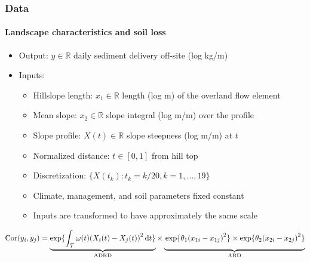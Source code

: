 \documentclass{snedecorbeamer}
\begin{document}
\begin{frame}
  \frametitle{Data}
  \framesubtitle{Landscape characteristics and soil loss}

  \begin{itemize}
  \item Output: $y\in\mathbb{R}$ daily sediment delivery off-site (log kg/m)
  \item Inputs:
    \begin{itemize}
    \item Hillslope length: $x_1\in\mathbb{R}$ length (log m) of the overland flow
      element
    \item Mean slope: $x_2\in\mathbb{R}$ slope integral (log m/m) over the profile
    \item Slope profile: $X(t)\in\mathbb{R}$ slope steepness (log m/m) at $t$
    \item Normalized distance: $t\in[0, 1]$ from hill top
    \item Discretization: $\{X(t_k) : t_k = k / 20, k = 1, \dots, 19\}$
    \item Climate, management, and soil parameters fixed constant
    \item Inputs are transformed to have approximately the same scale
    \end{itemize}
  \end{itemize}

  \vfill

  $\mathrm{Cor}(y_i, y_j) =
  \underbrace{\exp\{
    \int_\mathcal{T}
    \omega(t){(X_i(t) - X_j(t))}^2\,\mathrm{d}t\}
  }_{\mathrm{ADRD}}
  \times
  \underbrace{
    \vphantom{\int_\mathcal{T}}
      \exp\{\theta_1 {(x_{1i} - x_{1j})}^2\}
  \times
  \exp\{\theta_2 {(x_{2i} - x_{2j})}^2\}
  }_{\mathrm{ARD}}$
\end{frame}
\end{document}
